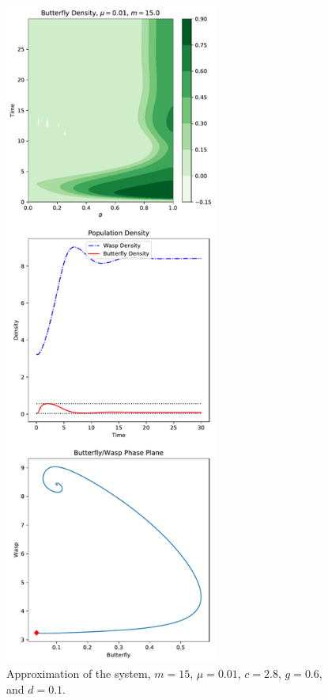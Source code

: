 \documentclass[12pt]{article}
\begin{document}
\begin{figure}[htb]
  \centering
  \includegraphics[width=7cm]{approximation-mu-01-m-15.pdf}
  \caption[Approximation with $m=15$ and $\mu=0.01$.]{Approximation of
    the system, $m=15$, $\mu=0.01$, $c=2.8$, $g=0.6$, and $d=0.1$. }
  \label{fig:approximationM15Mu01}
\end{figure}
\end{document}
